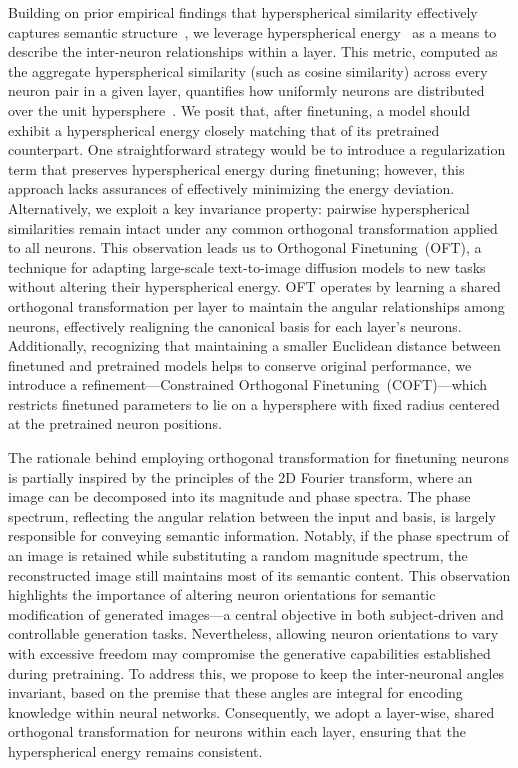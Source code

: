 Building on prior empirical findings that hyperspherical similarity effectively captures semantic structure~\cite{liu2017deep,liu2018decoupled,chen2020angular}, we leverage hyperspherical energy~\cite{liu2018learning} as a means to describe the inter-neuron relationships within a layer. This metric, computed as the aggregate hyperspherical similarity (such as cosine similarity) across every neuron pair in a given layer, quantifies how uniformly neurons are distributed over the unit hypersphere~\cite{liu2021learning}. We posit that, after finetuning, a model should exhibit a hyperspherical energy closely matching that of its pretrained counterpart. One straightforward strategy would be to introduce a regularization term that preserves hyperspherical energy during finetuning; however, this approach lacks assurances of effectively minimizing the energy deviation. Alternatively, we exploit a key invariance property: pairwise hyperspherical similarities remain intact under any common orthogonal transformation applied to all neurons. This observation leads us to Orthogonal Finetuning~(OFT), a technique for adapting large-scale text-to-image diffusion models to new tasks without altering their hyperspherical energy. OFT operates by learning a shared orthogonal transformation per layer to maintain the angular relationships among neurons, effectively realigning the canonical basis for each layer's neurons. Additionally, recognizing that maintaining a smaller Euclidean distance between finetuned and pretrained models helps to conserve original performance, we introduce a refinement—Constrained Orthogonal Finetuning~(COFT)—which restricts finetuned parameters to lie on a hypersphere with fixed radius centered at the pretrained neuron positions.

The rationale behind employing orthogonal transformation for finetuning neurons is partially inspired by the principles of the 2D Fourier transform, where an image can be decomposed into its magnitude and phase spectra. The phase spectrum, reflecting the angular relation between the input and basis, is largely responsible for conveying semantic information. Notably, if the phase spectrum of an image is retained while substituting a random magnitude spectrum, the reconstructed image still maintains most of its semantic content. This observation highlights the importance of altering neuron orientations for semantic modification of generated images—a central objective in both subject-driven and controllable generation tasks. Nevertheless, allowing neuron orientations to vary with excessive freedom may compromise the generative capabilities established during pretraining. To address this, we propose to keep the inter-neuronal angles invariant, based on the premise that these angles are integral for encoding knowledge within neural networks. Consequently, we adopt a layer-wise, shared orthogonal transformation for neurons within each layer, ensuring that the hyperspherical energy remains consistent.

